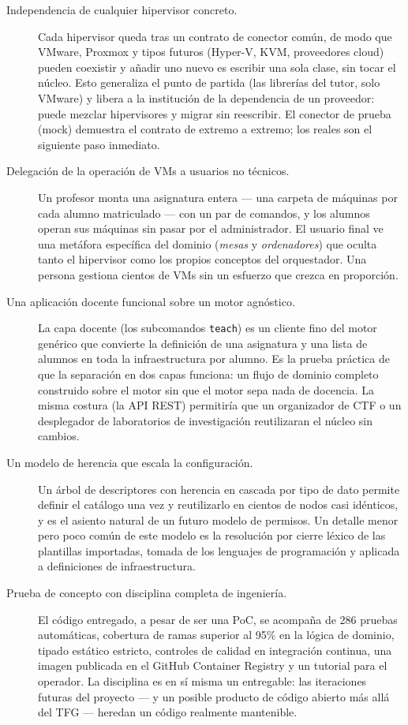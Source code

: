 \begin{description}
  \item[Independencia de cualquier hipervisor concreto.]
        Cada hipervisor queda tras un contrato de conector común, de
        modo que VMware, Proxmox y tipos futuros (Hyper-V, KVM,
        proveedores cloud) pueden coexistir y añadir uno nuevo es
        escribir una sola clase, sin tocar el núcleo. Esto generaliza
        el punto de partida (las librerías del tutor, solo VMware) y
        libera a la institución de la dependencia de un proveedor:
        puede mezclar hipervisores y migrar sin reescribir. El
        conector de prueba (mock) demuestra el contrato de extremo a
        extremo; los reales son el siguiente paso inmediato.
  \item[Delegación de la operación de VMs a usuarios no técnicos.]
        Un profesor monta una asignatura entera --- una carpeta de
        máquinas por cada alumno matriculado --- con un par de
        comandos, y los alumnos operan sus máquinas sin pasar por el
        administrador. El usuario final ve una metáfora específica del
        dominio (\emph{mesas} y \emph{ordenadores}) que oculta tanto el
        hipervisor como los propios conceptos del orquestador. Una
        persona gestiona cientos de VMs sin un esfuerzo que crezca en
        proporción.
  \item[Una aplicación docente funcional sobre un motor agnóstico.]
        La capa docente (los subcomandos \texttt{teach}) es un cliente
        fino del motor genérico que convierte la definición de una
        asignatura y una lista de alumnos en toda la infraestructura
        por alumno. Es la prueba práctica de que la separación en dos
        capas funciona: un flujo de dominio completo construido sobre
        el motor sin que el motor sepa nada de docencia. La misma
        costura (la API REST) permitiría que un organizador de CTF o un
        desplegador de laboratorios de investigación reutilizaran el
        núcleo sin cambios.
  \item[Un modelo de herencia que escala la configuración.]
        Un árbol de descriptores con herencia en cascada por tipo de
        dato permite definir el catálogo una vez y reutilizarlo en
        cientos de nodos casi idénticos, y es el asiento natural de un
        futuro modelo de permisos. Un detalle menor pero poco común de
        este modelo es la resolución por cierre léxico de las
        plantillas importadas, tomada de los lenguajes de programación
        y aplicada a definiciones de infraestructura.
  \item[Prueba de concepto con disciplina completa de ingeniería.]
        El código entregado, a pesar de ser una PoC, se acompaña de
        286 pruebas automáticas, cobertura de ramas superior al
        95\% en la lógica de dominio, tipado estático estricto,
        controles de calidad en integración continua, una imagen
        publicada en el GitHub Container Registry y un tutorial
        para el operador. La disciplina es en sí misma un
        entregable: las iteraciones futuras del proyecto --- y un
        posible producto de código abierto más allá del TFG ---
        heredan un código realmente mantenible.
\end{description}

